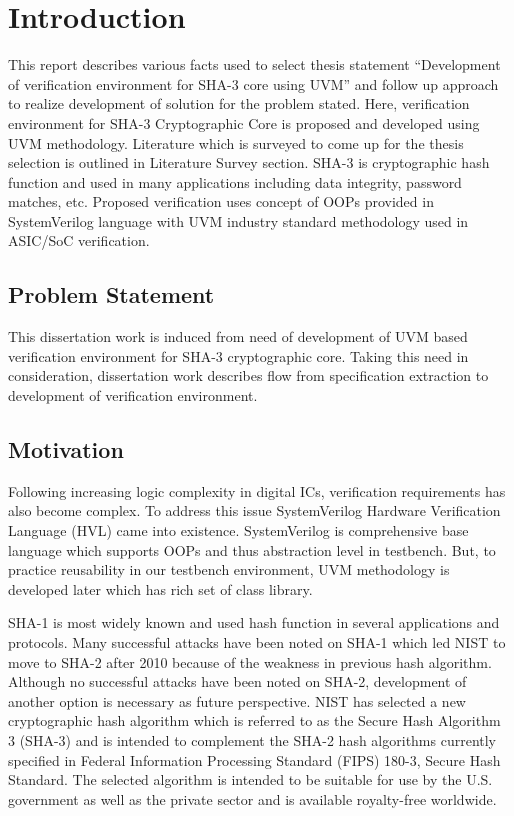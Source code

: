 \chapter{Introduction}

This report describes various facts used to select thesis statement “Development of verification environment for SHA-3 core using UVM” and follow up approach to realize development of solution for the problem stated. Here, verification environment for SHA-3 Cryptographic Core is proposed and developed using UVM methodology. Literature which is surveyed to come up for the thesis selection is outlined in Literature Survey section. SHA-3 is cryptographic hash function and used in many applications including data integrity, password matches, etc. Proposed verification uses concept of OOPs provided in SystemVerilog language with UVM industry standard methodology used in ASIC/SoC verification.

\section{Problem Statement}

This dissertation work is induced from need of development of UVM based verification environment for SHA-3 cryptographic core. Taking this need in consideration, dissertation work describes flow from specification extraction to development of verification environment.


\section{Motivation}

Following increasing logic complexity in digital ICs, verification requirements has also become complex. To address this issue SystemVerilog Hardware Verification Language (HVL) came into existence. SystemVerilog is comprehensive base language which supports OOPs and thus abstraction level in testbench. But, to practice reusability in our testbench environment, UVM methodology is developed later which has rich set of class library. \par

SHA-1 is most widely known and used hash function in several applications and protocols. Many successful attacks have been noted on SHA-1 which led NIST to move to SHA-2 after 2010 because of the weakness in previous hash algorithm. Although no successful attacks have been noted on SHA-2, development of another option is necessary as future perspective. NIST has selected a new cryptographic hash algorithm which is referred to as the Secure Hash Algorithm 3 (SHA-3) and is intended to complement the SHA-2 hash algorithms currently specified in Federal Information Processing Standard (FIPS) 180-3, Secure Hash Standard. The selected algorithm is intended to be suitable for use by the U.S. government as well as the private sector and is available royalty-free worldwide\cite{fips202}. \par

